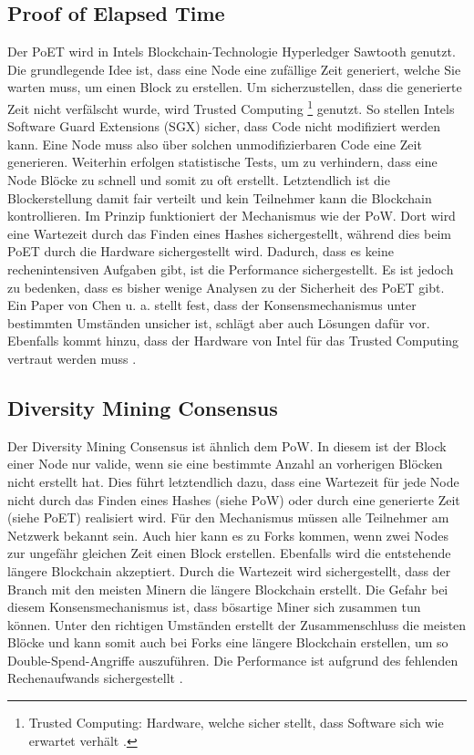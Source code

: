 \subsection{Proof of Elapsed Time}
Der PoET wird in Intels Blockchain-Technologie Hyperledger Sawtooth genutzt. Die grundlegende Idee ist, dass eine Node eine zufällige Zeit generiert, welche Sie warten muss, um einen Block zu erstellen. Um sicherzustellen, dass die generierte Zeit nicht verfälscht wurde, wird Trusted Computing \footnote{Trusted Computing: Hardware, welche sicher stellt, dass Software sich wie erwartet verhält \cite{MitchellTrustedComputing2005}.} genutzt. So stellen Intels Software Guard Extensions (SGX) sicher, dass Code nicht modifiziert werden kann. Eine Node muss also über solchen unmodifizierbaren Code eine Zeit generieren. Weiterhin erfolgen statistische Tests, um zu verhindern, dass eine Node Blöcke zu schnell und somit zu oft erstellt. Letztendlich ist die Blockerstellung damit fair verteilt und kein Teilnehmer kann die Blockchain kontrollieren. Im Prinzip funktioniert der Mechanismus wie der \acs{PoW}. Dort wird eine Wartezeit durch das Finden eines Hashes sichergestellt, während dies beim PoET durch die Hardware sichergestellt wird. Dadurch, dass es keine rechenintensiven Aufgaben gibt, ist die Performance sichergestellt. Es ist jedoch zu bedenken, dass es bisher wenige Analysen zu der Sicherheit des PoET gibt. Ein Paper von Chen u. a. stellt fest, dass der Konsensmechanismus unter bestimmten Umständen unsicher ist, schlägt aber auch Lösungen dafür vor. Ebenfalls kommt hinzu, dass der Hardware von Intel für das Trusted Computing vertraut werden muss \cite{ChenSecurityAnalysisProofofElapsedTime2017}.

\subsection{Diversity Mining Consensus}
Der Diversity Mining Consensus ist ähnlich dem \acs{PoW}. In diesem ist der Block einer Node nur valide, wenn sie eine bestimmte Anzahl an vorherigen Blöcken nicht erstellt hat. Dies führt letztendlich dazu, dass eine Wartezeit für jede Node nicht durch das Finden eines Hashes (siehe \acs{PoW}) oder durch eine generierte Zeit (siehe PoET) realisiert wird. Für den Mechanismus müssen alle Teilnehmer am Netzwerk bekannt sein. Auch hier kann es zu Forks kommen, wenn zwei Nodes zur ungefähr gleichen Zeit einen Block erstellen. Ebenfalls wird die entstehende längere Blockchain akzeptiert. Durch die Wartezeit wird sichergestellt, dass der Branch mit den meisten Minern die längere Blockchain erstellt. Die Gefahr bei diesem Konsensmechanismus ist, dass bösartige Miner sich zusammen tun können. Unter den richtigen Umständen erstellt der Zusammenschluss die meisten Blöcke und kann somit auch bei Forks eine längere Blockchain erstellen, um so Double-Spend-Angriffe auszuführen. Die Performance ist aufgrund des fehlenden Rechenaufwands sichergestellt \cite{GreenspanMultiChainPrivateBlockchain2015}\cite{CachinBlockchainConsensusProtocols2017}.

